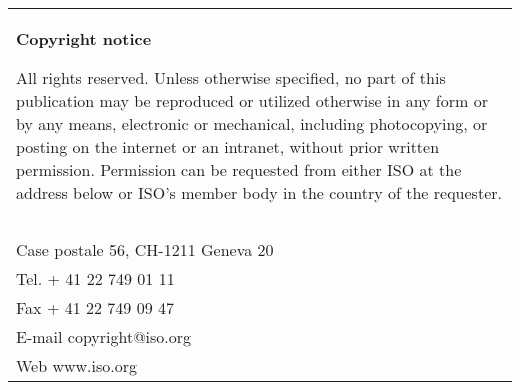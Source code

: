\begin{tabular}{|p{\hsize}|}
\hline
\begin{center}
\textbf{Copyright notice}
\end{center}

\vspace{2ex}

All rights reserved. Unless otherwise specified,
no part of this publication may be reproduced or
utilized otherwise in any form or by any means,
electronic or mechanical, including photocopying,
or posting on the internet or an intranet,
without prior written permission.
Permission can be requested
from either ISO at the address below
or ISO's member body in the country of the requester.\\\\

\begin{minipage}{\hsize}
\begin{indented}
ISO copyright office\\
Case postale 56, CH-1211 Geneva 20\\
Tel. + 41 22 749 01 11\\
Fax + 41 22 749 09 47\\
E-mail copyright@iso.org\\
Web www.iso.org
\end{indented}
\end{minipage}
\\
\hline
\end{tabular}

\newpage
